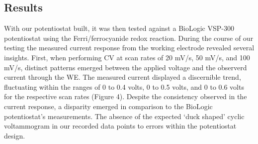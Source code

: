 \documentclass{article}
\begin{document}
\subsection*{Results}
With our potentiostat built, it was then tested against a BioLogic VSP-300 potentiostat using the Ferri/ferrocyanide redox reaction. During the course of our testing the measured current response from the working electrode revealed several insights. First, when performing CV at scan rates of 20 mV/s, 50 mV/s, and 100 mV/s, distinct patterns emerged between the applied voltage and the observerd current through the WE. The measured current displayed a discernible trend, fluctuating within the ranges of 0 to 0.4 volts, 0 to 0.5 volts, and 0 to 0.6 volts for the respective scan rates (Figure 4).  Despite the consistency observed in the current response, a disparity emerged in comparison to the BioLogic potentiostat's measurements. The absence of the expected `duck shaped' cyclic voltammogram in our recorded data points to errors within the potentiostat design.
\end{document}
